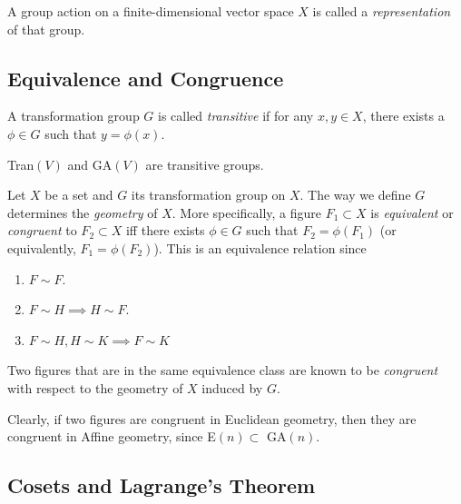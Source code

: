 \documentclass{article}
\begin{document}
    \begin{definition}
      A group action on a finite-dimensional vector space $X$ is called a \textit{representation} of that group. 
    \end{definition}

  \subsection{Equivalence and Congruence}

    \begin{definition}
      A transformation group $G$ is called \textit{transitive} if for any $x, y \in X$, there exists a $\phi \in G$ such that $y = \phi(x)$. 
    \end{definition}

    \begin{example}
      Tran$(V)$ and GA$(V)$ are transitive groups. 
    \end{example}

    \begin{definition}
      Let $X$ be a set and $G$ its transformation group on $X$. The way we define $G$ determines the \textit{geometry} of $X$. More specifically, a figure $F_{1} \subset X$ is \textit{equivalent} or \textit{congruent} to $F_{2} \subset X$ iff there exists $\phi \in G$ such that $F_{2} = \phi (F_{1})$ (or equivalently, $F_{1} = \phi (F_{2})$). This is an equivalence relation since
      \begin{enumerate}
        \item $F \sim F$. 
        \item $F \sim H \implies H \sim F$. 
        \item $F \sim H, H \sim K \implies F \sim K$
      \end{enumerate}
      Two figures that are in the same equivalence class are known to be \textit{congruent} with respect to the geometry of $X$ induced by $G$. 
    \end{definition}

    Clearly, if two figures are congruent in Euclidean geometry, then they are congruent in Affine geometry, since E$(n) \subset$ GA$(n)$. 

  \subsection{Cosets and Lagrange's Theorem}
\end{document}
